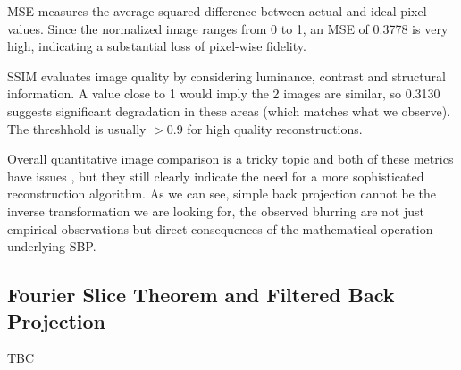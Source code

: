 \documentclass{article}
\theoremstyle{definition}
\begin{document}
MSE measures the average squared difference between actual and ideal pixel values. Since the normalized image ranges from 0 to 1, an MSE of 0.3778 is very high, indicating a substantial loss of pixel-wise fidelity.

SSIM evaluates image quality by considering luminance, contrast and structural information. A value close to 1 would imply the 2 images are similar, so 0.3130 suggests significant degradation in these areas (which matches what we observe). The threshhold is usually $> 0.9$ for high quality reconstructions.

Overall quantitative image comparison is a tricky topic and both of these metrics have issues \cite{Nilsson2020}, but they still clearly indicate the need for a more sophisticated reconstruction algorithm. As we can see, simple back projection cannot be the inverse transformation we are looking for, the observed blurring are not just empirical observations but direct consequences of the mathematical operation underlying SBP.

\subsection{Fourier Slice Theorem and Filtered Back Projection}
TBC



\end{document}
